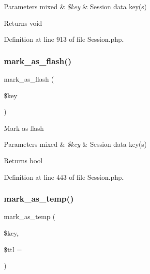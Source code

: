 \begin{DoxyParams}[1]{Parameters}
mixed & {\em \$key} & Session data key(s) \\
\hline
\end{DoxyParams}
\begin{DoxyReturn}{Returns}
void 
\end{DoxyReturn}


Definition at line 913 of file Session.\+php.

\mbox{\label{class_c_i___session_a81fdbc2498fc26532aee037f03dbaf55}} 
\subsubsection{\texorpdfstring{mark\_as\_flash()}{mark\_as\_flash()}}
{\footnotesize\ttfamily mark\+\_\+as\+\_\+flash (\begin{DoxyParamCaption}\item[{}]{\$key }\end{DoxyParamCaption})}

Mark as flash


\begin{DoxyParams}[1]{Parameters}
mixed & {\em \$key} & Session data key(s) \\
\hline
\end{DoxyParams}
\begin{DoxyReturn}{Returns}
bool 
\end{DoxyReturn}


Definition at line 443 of file Session.\+php.

\mbox{\label{class_c_i___session_ab55f3c6806c359d98edd6138ef33ecf0}} 
\subsubsection{\texorpdfstring{mark\_as\_temp()}{mark\_as\_temp()}}
{\footnotesize\ttfamily mark\+\_\+as\+\_\+temp (\begin{DoxyParamCaption}\item[{}]{\$key,  }\item[{}]{\$ttl = {} }\end{DoxyParamCaption})}

